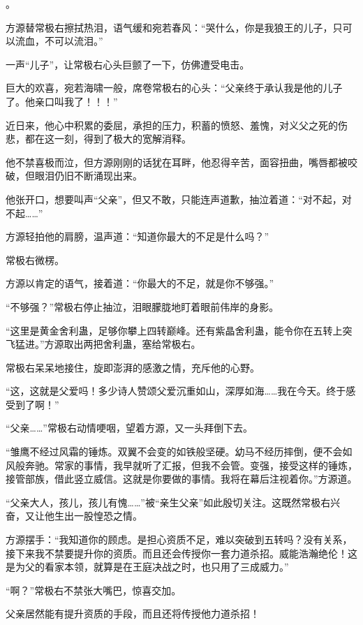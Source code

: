 
\begin{this_body}

。

方源替常极右擦拭热泪，语气缓和宛若春风：“哭什么，你是我狼王的儿子，只可以流血，不可以流泪。”

一声“儿子”，让常极右心头巨颤了一下，仿佛遭受电击。

巨大的欢喜，宛若海啸一般，席卷常极右的心头：“父亲终于承认我是他的儿子了。他亲口叫我了！！！”

近日来，他心中积累的委屈，承担的压力，积蓄的愤怒、羞愧，对义父之死的伤悲，都在这一刻，得到了极大的宽解消释。

他不禁喜极而泣，但方源刚刚的话犹在耳畔，他忍得辛苦，面容扭曲，嘴唇都被咬破，但眼泪仍旧不断涌现出来。

他张开口，想要叫声“父亲”，但又不敢，只能连声道歉，抽泣着道：“对不起，对不起……”

方源轻拍他的肩膀，温声道：“知道你最大的不足是什么吗？”

常极右微楞。

方源以肯定的语气，接着道：“你最大的不足，就是你不够强。”

“不够强？”常极右停止抽泣，泪眼朦胧地盯着眼前伟岸的身影。

“这里是黄金舍利蛊，足够你攀上四转巅峰。还有紫晶舍利蛊，能令你在五转上突飞猛进。”方源取出两把舍利蛊，塞给常极右。

常极右呆呆地接住，旋即澎湃的感激之情，充斥他的心野。

“这，这就是父爱吗！多少诗人赞颂父爱沉重如山，深厚如海……我在今天。终于感受到了啊！”

“父亲……”常极右动情哽咽，望着方源，又一头拜倒下去。

“雏鹰不经过风霜的锤炼。双翼不会变的如铁般坚硬。幼马不经历摔倒，便不会如风般奔驰。常家的事情，我早就听了汇报，但我不会管。变强，接受这样的锤炼，接管部族，借此竖立威信。这就是你要做的事情。我将在幕后注视着你。”方源道。

“父亲大人，孩儿，孩儿有愧……”被“亲生父亲”如此殷切关注。这既然常极右兴奋，又让他生出一股惶恐之情。

方源摆手：“我知道你的顾虑。是担心资质不足，难以突破到五转吗？没有关系，接下来我不禁要提升你的资质。而且还会传授你一套力道杀招。威能浩瀚绝伦！这是为父的看家本领，就算是在王庭决战之时，也只用了三成威力。”

“啊？”常极右不禁张大嘴巴，惊喜交加。

父亲居然能有提升资质的手段，而且还将传授他力道杀招！


\end{this_body}
